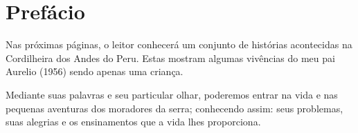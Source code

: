 \cleardoublepage
\newpage
\thispagestyle{empty}
\vfill


\chapter*{Prefácio} %

Nas próximas páginas, o leitor conhecerá um conjunto de histórias acontecidas na Cordilheira dos Andes do Peru. Estas mostram algumas vivências do meu pai Aurelio (1956) sendo apenas uma criança.

Mediante suas palavras e seu particular olhar, poderemos entrar na vida e nas pequenas aventuras dos moradores da serra; conhecendo assim: seus problemas, suas alegrias e os ensinamentos que a vida lhes proporciona. 
\vfill

\newpage
\thispagestyle{empty}

